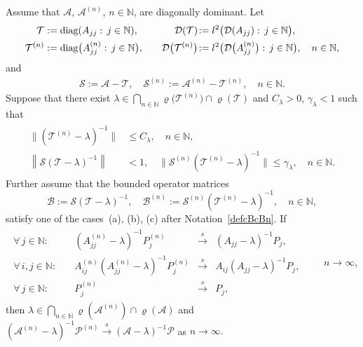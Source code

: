 \documentclass[a4paper,reqno]{amsart}
\begin{document}
\begin{theorem} \label{gsrdiag}
Assume that ${\mathcal A}$, ${\mathcal A}^{(n)}$, $n\in{\mathbb{N}}$, are diagonally dominant.
Let
\begin{equation} \label{defcTcTn}
\begin{aligned}
 {\mathcal T}&:={{\rm diag} }(A_{jj}:\,j\in{\mathbb{N}}),  \quad &{\mathcal D}({\mathcal T})&\!:=l^2\big({\mathcal D}(A_{jj}):\,j\in{\mathbb{N}}\big), \\
{\mathcal T}^{(n)}&:={{\rm diag} }\big(A_{jj}^{(n)}:\,j\in{\mathbb{N}}\big),   \quad &{\mathcal D}\big({\mathcal T}^{(n)}\big)&\!:=l^2\big({\mathcal D}\big(A_{jj}^{(n)}\big):\,j\in{\mathbb{N}}\big),\quad n\in{\mathbb{N}},
\end{aligned}
\end{equation}
and
\begin{align*}
{\mathcal S}:={\mathcal A}-{\mathcal T}, \quad {\mathcal S}^{(n)}:={\mathcal A}^{(n)}-{\mathcal T}^{(n)}, \quad n\in{\mathbb{N}}.
 \end{align*}
Suppose that there exist $\lambda\in\underset{n\in{\mathbb{N}}}{\bigcap}\varrho\big({\mathcal T}^{(n)}\big)\cap\varrho({\mathcal T})$ and $C_\lambda>0$, $\gamma_\lambda<1$ such that
\begin{align}
\begin{aligned}
\big\|({\mathcal T}^{(n)}-\lambda)^{-1}\big\|&\leq C_\lambda, \quad n\in{\mathbb{N}},\\
\left\|{\mathcal S}({\mathcal T}-\lambda)^{-1}\right\|&<1,\quad \big\|{\mathcal S}^{(n)}({\mathcal T}^{(n)}-\lambda)^{-1}\big\|\leq \gamma_\lambda,\quad n\in{\mathbb{N}}.\label{eqSTbddinfinite}
\end{aligned}
\end{align}
Further assume that the bounded operator matrices $${\mathcal B}:={\mathcal S}({\mathcal T}-\lambda)^{-1}, \quad {\mathcal B}^{(n)}:={\mathcal S}^{(n)}({\mathcal T}^{(n)}-\lambda)^{-1}, \quad n\in{\mathbb{N}},$$ satisfy one of the cases~{\rm(a), (b), (c)} after Notation{\rm~\ref{defcBcBn}}.
If
 \begin{align*}
\begin{array}{lrll}
 \forall\,j\in{\mathbb{N}}:\quad &(A_{jj}^{(n)}-\lambda)^{-1}P_j^{(n)}&{\stackrel{s}{\longrightarrow}} &(A_{jj}-\lambda)^{-1}P_j,\\[1mm]
\forall\,i,j\in{\mathbb{N}}:\quad &A_{ij}^{(n)}(A_{jj}^{(n)}-\lambda)^{-1}P_j^{(n)}&{\stackrel{s}{\longrightarrow}} &A_{ij}(A_{jj}-\lambda)^{-1}P_j,\\[1mm]
\forall\,j\in{\mathbb{N}}:\quad &P_j^{(n)}&{\stackrel{s}{\longrightarrow}} &P_j,
 \end{array} \qquad n\to\infty,\label{eqconvforalldiag}
 \end{align*}
then $\lambda\in\underset{n\in{\mathbb{N}}}{\bigcap}\varrho({\mathcal A}^{(n)})\cap\varrho({\mathcal A})$ and 
$ ({\mathcal A}^{(n)}-\lambda)^{-1}{\mathcal P}^{(n)}{\stackrel{s}{\rightarrow}}({\mathcal A}-\lambda)^{-1}{\mathcal P}$ as $n\to\infty.$
\end{theorem}
\end{document}
